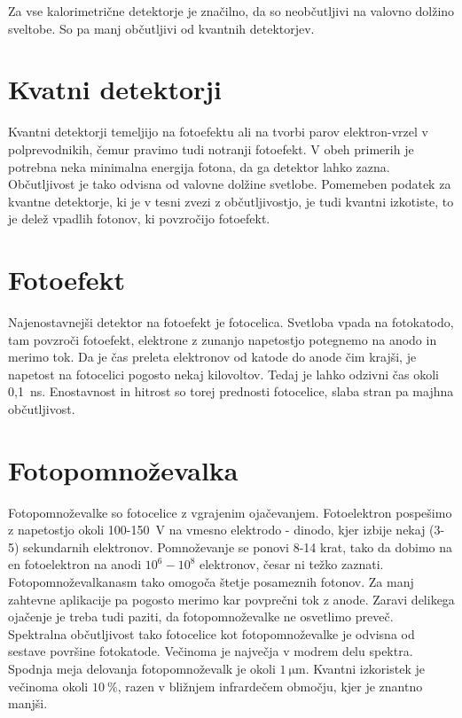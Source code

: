 Za vse kalorimetrične detektorje je značilno, da so neobčutljivi na valovno dolžino sveltobe. So
pa manj občutljivi od kvantnih detektorjev.

\section{Kvatni detektorji}

Kvantni detektorji temeljijo na fotoefektu ali na tvorbi parov elektron-vrzel
v polprevodnikih, čemur pravimo tudi notranji fotoefekt. V obeh primerih je potrebna neka
minimalna energija fotona, da ga detektor lahko zazna. Občutljivost je tako odvisna od 
valovne dolžine svetlobe. Pomemeben podatek za kvantne detektorje, ki je v tesni zvezi 
z občutljivostjo, je tudi kvantni izkotiste, to je delež vpadlih fotonov, ki povzročijo fotoefekt.

\section{Fotoefekt}

Najenostavnejši detektor na fotoefekt je fotocelica. Svetloba vpada na fotokatodo, tam povzroči
fotoefekt, elektrone z zunanjo napetostjo potegnemo na anodo in merimo tok. Da je čas preleta
elektronov od katode do anode čim krajši, je napetost na fotocelici pogosto nekaj kilovoltov.
Tedaj je lahko odzivni čas okoli 0,1~ns. Enostavnost in hitrost so torej prednosti fotocelice, slaba
stran pa majhna občutljivost.

\section{Fotopomnoževalka}
Fotopomnoževalke so fotocelice z vgrajenim ojačevanjem. Fotoelektron pospešimo z napetostjo
okoli 100-150~V na vmesno elektrodo - dinodo, kjer izbije nekaj (3-5) sekundarnih elektronov. 
Pomnoževanje se ponovi 8-14 krat, tako da dobimo na en fotoelektron na anodi $10^6 - 10^8$ 
elektronov, česar ni težko zaznati. Fotopomnoževalkanasm tako omogoča štetje posameznih fotonov.
Za manj zahtevne aplikacije pa pogosto merimo kar povprečni tok z anode. Zaravi delikega ojačenje
je treba tudi paziti, da fotopomnoževalke ne osvetlimo preveč. Spektralna občutljivost
tako fotocelice kot fotopomnoževalke je odvisna od sestave površine fotokatode. Večinoma
je največja v modrem delu spektra. Spodnja meja delovanja fotopomnoževalk je okoli $1~\si{\micro\metre}$.
Kvantni izkoristek je večinoma okoli $10~\%$, razen v bližnjem infrardečem območju, kjer
je znantno manjši. 

